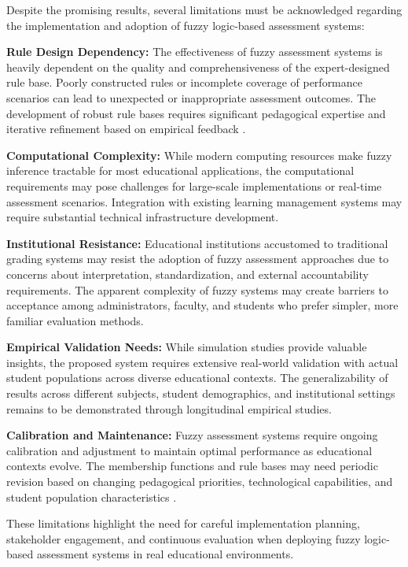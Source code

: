 Despite the promising results, several limitations must be acknowledged regarding the implementation and adoption of fuzzy logic-based assessment systems:

\textbf{Rule Design Dependency:} The effectiveness of fuzzy assessment systems is heavily dependent on the quality and comprehensiveness of the expert-designed rule base. Poorly constructed rules or incomplete coverage of performance scenarios can lead to unexpected or inappropriate assessment outcomes. The development of robust rule bases requires significant pedagogical expertise and iterative refinement based on empirical feedback \cite{Chen2023}.

\textbf{Computational Complexity:} While modern computing resources make fuzzy inference tractable for most educational applications, the computational requirements may pose challenges for large-scale implementations or real-time assessment scenarios. Integration with existing learning management systems may require substantial technical infrastructure development.

\textbf{Institutional Resistance:} Educational institutions accustomed to traditional grading systems may resist the adoption of fuzzy assessment approaches due to concerns about interpretation, standardization, and external accountability requirements. The apparent complexity of fuzzy systems may create barriers to acceptance among administrators, faculty, and students who prefer simpler, more familiar evaluation methods.

\textbf{Empirical Validation Needs:} While simulation studies provide valuable insights, the proposed system requires extensive real-world validation with actual student populations across diverse educational contexts. The generalizability of results across different subjects, student demographics, and institutional settings remains to be demonstrated through longitudinal empirical studies.

\textbf{Calibration and Maintenance:} Fuzzy assessment systems require ongoing calibration and adjustment to maintain optimal performance as educational contexts evolve. The membership functions and rule bases may need periodic revision based on changing pedagogical priorities, technological capabilities, and student population characteristics \cite{Ahmed2023, Kumar2023}.

These limitations highlight the need for careful implementation planning, stakeholder engagement, and continuous evaluation when deploying fuzzy logic-based assessment systems in real educational environments.
